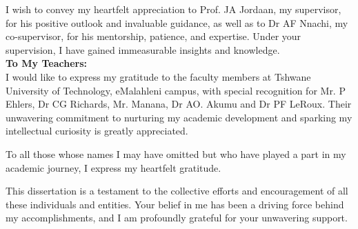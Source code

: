 I wish to convey my heartfelt appreciation to Prof. JA Jordaan, my supervisor, for his positive outlook and invaluable guidance, as well as to Dr AF Nnachi, my co-supervisor, for his mentorship, patience, and expertise. Under your supervision, I have gained immeasurable insights and knowledge.
\vspace{0.5cm}
\textbf{\\To My Teachers:\\} 
I would like to express my gratitude to the faculty members at Tshwane University of Technology, eMalahleni campus, with special recognition for Mr. P Ehlers, Dr CG Richards, Mr. Manana, Dr AO. Akumu and Dr PF LeRoux. Their unwavering commitment to nurturing my academic development and sparking my intellectual curiosity is greatly appreciated.\par
To all those whose names I may have omitted but who have played a part in my academic journey, I express my heartfelt gratitude.\par
This dissertation is a testament to the collective efforts and encouragement of all these individuals and entities. Your belief in me has been a driving force behind my accomplishments, and I am profoundly grateful for your unwavering support.